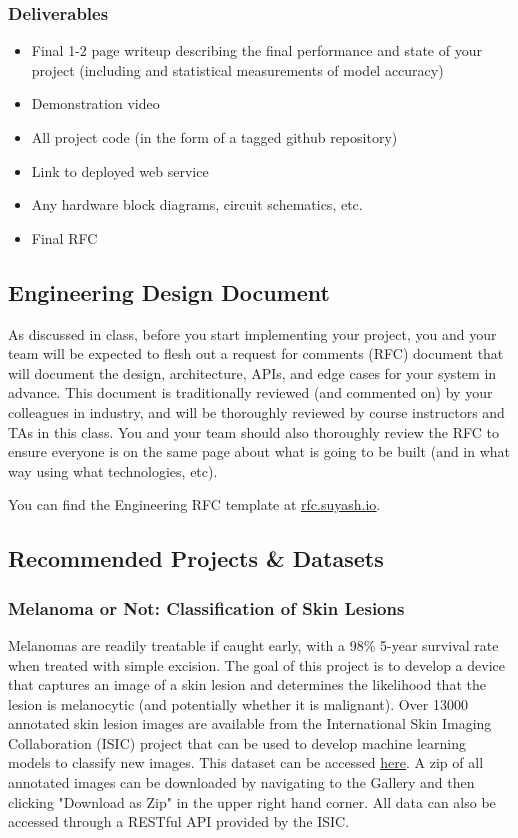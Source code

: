 \subsubsection*{Deliverables}
\begin{itemize}
	\item Final 1-2 page writeup describing the final performance and state of your project (including and statistical measurements of model accuracy)
	\item Demonstration video
	\item All project code (in the form of a tagged github repository)
	\item Link to deployed web service 
	\item Any hardware block diagrams, circuit schematics, etc.
	\item Final RFC
\end{itemize}

\subsection*{Engineering Design Document}
As discussed in class, before you start implementing your project, you and your team will be expected to flesh out a request for comments (RFC) document that will document the design, architecture, APIs, and edge cases for your system in advance. This document is traditionally reviewed (and commented on) by your colleagues in industry, and will be thoroughly reviewed by course instructors and TAs in this class. You and your team should also thoroughly review the RFC to ensure everyone is on the same page about what is going to be built (and in what way using what technologies, etc). 

You can find the Engineering RFC template at \underline{\href{http://rfc.suyash.io}{rfc.suyash.io}}.

\subsection*{Recommended Projects \& Datasets}
\subsubsection*{Melanoma or Not: Classification of Skin Lesions}
Melanomas are readily treatable if caught early, with a 98\% 5-year survival rate when treated with simple excision. The goal of this project is to develop a device that captures an image of a skin lesion and determines the likelihood that the lesion is melanocytic (and potentially whether it is malignant). Over 13000 annotated skin lesion images are available from the International Skin Imaging Collaboration (ISIC) project that can be used to develop machine learning models to classify new images. This dataset can be accessed \underline{\href{https://isic-archive.com}{here}}. A zip of all annotated images can be downloaded by navigating to the Gallery and then clicking "Download as Zip" in the upper right hand corner. All data can also be accessed through a RESTful API provided by the ISIC.


